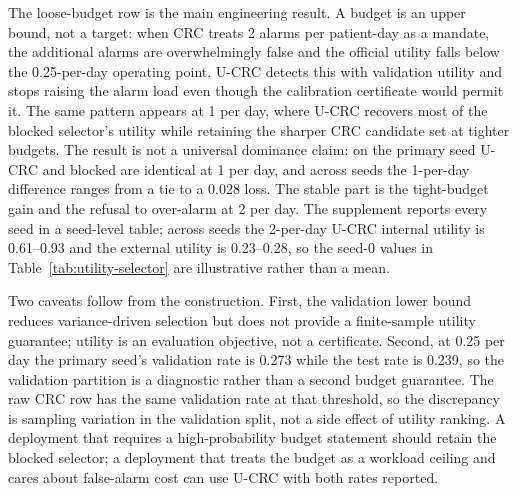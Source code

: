 \begin{table}[tb]
\centering
\caption{Official 2019 utility for the blocked, raw CRC and utility-ranked CRC selectors on the primary seed. Internal A is the held-out test partition; external B is the transported evaluation. U-CRC ranks the CRC-feasible thresholds by a one-sided validation utility bound (\cref{eq:utility-select}); it is a deployment variant of CRC, not a second risk certificate.}
\label{tab:utility-selector}
\small
{}
\end{table}

The loose-budget row is the main engineering result. A budget is an upper bound, not a target: when CRC treats 2 alarms per patient-day as a mandate, the additional alarms are overwhelmingly false and the official utility falls below the 0.25-per-day operating point. U-CRC detects this with validation utility and stops raising the alarm load even though the calibration certificate would permit it. The same pattern appears at 1 per day, where U-CRC recovers most of the blocked selector's utility while retaining the sharper CRC candidate set at tighter budgets. The result is not a universal dominance claim: on the primary seed U-CRC and blocked are identical at 1 per day, and across seeds the 1-per-day difference ranges from a tie to a 0.028 loss. The stable part is the tight-budget gain and the refusal to over-alarm at 2 per day. The supplement reports every seed in a seed-level table; across seeds the 2-per-day U-CRC internal utility is 0.61--0.93 and the external utility is 0.23--0.28, so the seed-0 values in Table~\ref{tab:utility-selector} are illustrative rather than a mean.

Two caveats follow from the construction. First, the validation lower bound reduces variance-driven selection but does not provide a finite-sample utility guarantee; utility is an evaluation objective, not a certificate. Second, at 0.25 per day the primary seed's validation rate is 0.273 while the test rate is 0.239, so the validation partition is a diagnostic rather than a second budget guarantee. The raw CRC row has the same validation rate at that threshold, so the discrepancy is sampling variation in the validation split, not a side effect of utility ranking. A deployment that requires a high-probability budget statement should retain the blocked selector; a deployment that treats the budget as a workload ceiling and cares about false-alarm cost can use U-CRC with both rates reported.
